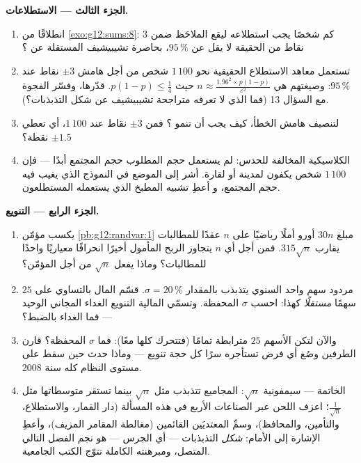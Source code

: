 \begin{problem}
\medskip
\noindent\textbf{الجزء الثالث --- الاستطلاعات.}
\begin{enumerate}[resume]
  \item انطلاقًا من \cref{exo:g12:sums:8}: كم شخصًا يجب
        استطلاعه ليقع  الملاحَظ ضمن $3$
        نقاط من الحقيقة  لا يقل عن
        $95\,\%$، بحاصرة تشيبيشيف المستقلة عن ؟
  \item تستعمل معاهد الاستطلاع الحقيقية نحو $1\,100$ شخص من أجل
        هامش $\pm 3$ نقاط عند $95\,\%$: وصيغتهم هي
        $n \approx \frac{1.96^2 \times p(1-p)}
        {\varepsilon^2}$ حيث $p(1-p) \leq \frac14$. قدّرها،
        وفسّر الفجوة مع السؤال 13 (فما الذي
        لا تعرفه متراجحة تشيبيشيف عن شكل
        التذبذبات؟).
  \item لتنصيف هامش الخطأ، كيف يجب أن تنمو
        ؟ فمن $\pm 3$ نقاط عند $1\,100$، أي 
        تعطي $\pm 1.5$ نقطة؟
  \item الكلاسيكية المخالفة للحدس: لم يستعمل حجم  المطلوب
        حجم المجتمع أبدًا --- فإن $1\,100$ شخص
        يكفون لمدينة أو لقارة. أشر إلى الموضع
        في النموذج الذي يغيب فيه حجم المجتمع، و
        أعطِ تشبيه المطبخ الذي يستعمله المستطلعون.
\end{enumerate}

\medskip
\noindent\textbf{الجزء الرابع --- التنويع.}
\begin{enumerate}[resume]
  \item يكسب مؤمّن \cref{pb:g12:randvar:1} مبلغ
        $30n$ أورو أملًا رياضيًا على $n$ عقدًا  للمطالبات يقارب $315\sqrt n$. فمن أجل
        أي $n$ يتجاوز الربح المأمول أخيرًا انحرافًا
        معياريًا واحدًا للمطالبات؟ وماذا يفعل
        $\sqrt n$ من أجل المؤمّن؟
  \item مردود سهم واحد السنوي يتذبذب بالمقدار
        $\sigma = 20\,\%$. قسّم المال بالتساوي على $25$
        سهمًا \emph{مستقلًا} كهذا: احسب
        $\sigma$ المحفظة. وتسمّي المالية التنويع
        الغداء المجاني الوحيد --- فما الغداء بالضبط؟
  \item والآن لتكن الأسهم $25$ مترابطة تمامًا (فتتحرك
        كلها معًا): فما $\sigma$ المحفظة؟
        قارن الطرفين وصُغ أي فرض تستأجره سرًا
        كل حجة تنويع --- وماذا حدث حين سقط على مستوى النظام كله سنة 2008.
  \item الخاتمة --- سيمفونية $\sqrt n$: المجاميع تتذبذب مثل
        $\sqrt n$ بينما تستقر متوسطاتها مثل
        $\frac{1}{\sqrt n}$؛ اعزف اللحن عبر الصناعات
        الأربع في هذه المسألة (دار القمار، والاستطلاع، والتأمين،
        والمحافظ)، وسمِّ المعتديَين القائمين (مغالطة
        المقامر  المزيف)، وأعطِ
        الإشارة إلى الأمام: \emph{شكل} التذبذبات
        --- أي الجرس --- هو نجم الفصل التالي
        المتصل، ومبرهنته الكاملة تتوّج الكتب
        الجامعية.
\end{enumerate}
\end{problem}
